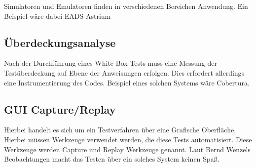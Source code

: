 Simulatoren und Emulatoren finden in verschiedenen Bereichen Anwendung. Ein Beispiel wäre dabei EADS-Astrium

\subsection{Überdeckungsanalyse}
Nach der Durchführung eines White-Box Tests muss eine Messung der Testüberdeckung auf Ebene der Anweisungen erfolgen. Dies erfordert allerdings eine Instrumentierung des Codes. Beispiel eines solchen Systems wäre Cobertura.

\subsection{GUI Capture/Replay}
Hierbei handelt es sich um ein Testverfahren über eine Grafische Oberfläche. Hierbei müssen Werkzeuge verwendet werden, die diese Tests automatisiert. Diese Werkzeuge werden Capture und Replay Werkzeuge genannt. Laut Bernd Wenzels Beobachtungen macht das Testen über ein solches System keinen Spaß. 